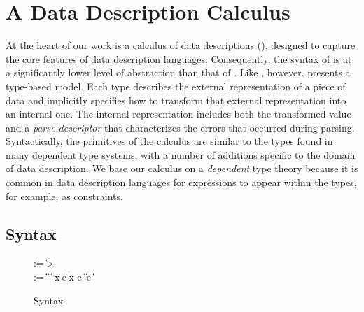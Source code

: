 \section{A Data Description Calculus}

At the heart of our work is a calculus of data descriptions (\ddc{}),
designed to capture the core features of data description languages.
Consequently, the syntax of \ddc{} is at a significantly lower level
of abstraction than that of \ipads{}.  Like \ipads{}, however, \ddc{}
presents a type-based model.  Each \ddc{} type describes the external
representation of a piece of data and implicitly specifies how to
transform that external representation into an internal one.  The
internal representation includes both the transformed value and a
\textit{parse descriptor} that characterizes the errors that occurred
during parsing. Syntactically, the primitives of the calculus are
similar to the types found in many dependent type systems, with a
number of additions specific to the domain of data description.
We base our calculus on a \textit{dependent} type theory because it is
common in data description languages for expressions to appear within
the types, for example, as constraints.


\subsection{\ddc{} Syntax}
\begin{figure}
{\small
\begin{bnf}
   \meta{\gk} \::= \kty \| \ity \-> \gk 
                               \pext{\| \gk \-> \gk} \\
   \meta{\ty} \::= 
    \ptyvar \| \ptrue\| \pfalse \|  \| 
    \plam{\var}{\ity}{\ty} \|  \nlalt
    \psig x \ty \ty \| \psum \ty e \ty \| \pand \ty \ty \|
    \pset x \ty e \| \pseq \ty {} \nlalt
    \pmu{\ptyvar}{\ty} \| \pcompute e \ity \| \pabsorb \ty \| \pscan{\ty} 
\end{bnf}
}
\caption{\ddc{} Syntax}
\label{fig:ddc-syntax}
\end{figure}

